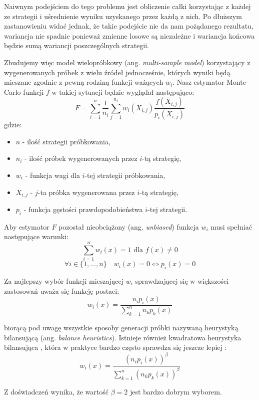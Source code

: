 \documentclass[../main.tex]{subfiles}
\begin{document}
Naiwnym podejściem do tego problemu jest obliczenie całki korzystając z każdej ze strategii i uśrednienie wyniku uzyskanego przez każdą z nich. Po dłuższym zastanowieniu widać jednak, że takie podejście nie da nam pożądanego rezultatu, wariancja nie spadnie ponieważ zmienne losowe są niezależne i wariancja końcowa będzie sumą wariancji poszczególnych strategii.

Zbudujemy więc model wielopróbkowy (ang. \textit{multi-sample model}) \cite{pbrt,ImportanceSamplingForProduction} korzystający z wygenerowanych próbek z wielu źródeł jednocześnie, których wyniki będą mieszane zgodnie z pewną rodziną funkcji ważących $w_i$. Nasz estymator Monte-Carlo funkcji $f$ w takiej sytuacji będzie wyglądał następująco:
\begin{equation}
  F = \sum_{i=1}^{n} \frac{1}{n_i} \sum_{j=1}^{n_i} w_{i}(X_{i,j}) \frac{
    f(X_{i,j})
  }{
    p_{i}(X_{i,j})
  }
\end{equation}
\noindent gdzie:
\begin{itemize}
	\item $n$ - ilość strategii próbkowania,
	\item $n_i$ - ilość próbek wygenerowanych przez $i$-tą strategię,
	\item $w_i$ - funkcja wagi dla $i$-tej strategii próbkowania,
	\item $X_{i,j}$ - $j$-ta próbka wygenerowana przez $i$-tą strategię,
	\item $p_i$ - funkcja gęstości prawdopodobieństwa $i$-tej strategii.
\end{itemize}

Aby estymator $F$ pozostał nieobciążony (ang. \textit{unbiased}) funkcja $w_i$ musi spełniać następujące warunki:
\begin{equation}
\sum_{i = 1}^{n} w_{i}(x) = 1 \text{ dla } f(x) \neq 0
\end{equation}
\begin{equation}
  \forall i \in \{ 1, \ldots, n \} \quad
  w_{i}(x) = 0 \Leftrightarrow p_i(x) = 0
\end{equation}

Za najlepszy wybór funkcji mieszającej $w_i$ sprawdzającej się w większości zastosowań uważa się funkcję postaci:
\begin{equation}
  w_{i}(x) = \frac{
    n_{i} p_{i}(x)
  }{
    \sum_{k=1}^{n} {
      n_{k} p_{k}(x)
    }
  }
\end{equation}

\noindent biorącą pod uwagę wszystkie sposoby generacji próbki nazywaną heurystyką bilansującą (ang. \textit{balance heuristics}). Istnieje również kwadratowa heurystyka bilansująca \cite{pbrt}, która w praktyce bardzo często sprawdza się jeszcze lepiej \cite{pbrt,Veach}:
\begin{equation}
  w_{i}(x) = 
  \frac{
	\left( n_{i} p_{i}(x) \right)^{\beta}
  }{
	\sum_{k=1}^{n} {
		\left(n_{k} p_{k}(x)\right)^{\beta}
	}
  }
\end{equation}

Z doświadczeń \cite{Veach} wynika, że wartość $\beta = 2$ jest bardzo dobrym wyborem.
\end{document}

